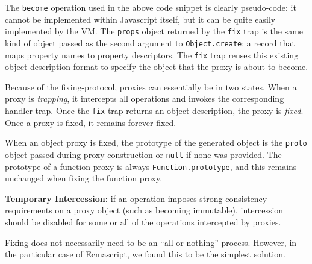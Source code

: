 \documentclass{acm_proc_article-sp}
\begin{document}
The \texttt{become} operation used in the above code snippet is clearly pseudo-code: it cannot be implemented within Javascript itself, but it can be quite easily implemented by the VM. The \texttt{props} object returned by the \texttt{fix} trap is the same kind of object passed as the second argument to \texttt{Object.create}: a record that maps property names to property descriptors. The \texttt{fix} trap reuses this existing object-description format to specify the object that the proxy is about to become.

Because of the fixing-protocol, proxies can essentially be in two states. When a proxy is \emph{trapping}, it intercepts all operations and invokes the corresponding handler trap. Once the \texttt{fix} trap returns an object description, the proxy is \emph{fixed}. Once a proxy is fixed, it remains forever fixed.

When an object proxy is fixed, the prototype of the generated object is the \texttt{proto} object passed during proxy construction or \texttt{null} if none was provided. The prototype of a function proxy is always \texttt{Function.prototype}, and this remains unchanged when fixing the function proxy.

\textbf{Temporary Intercession:} if an operation imposes strong consistency requirements on a proxy object (such as becoming immutable), intercession should be disabled for some or all of the operations intercepted by proxies.

Fixing does not necessarily need to be an ``all or nothing'' process. However, in the particular case of Ecmascript, we found this to be the simplest solution.


%
%
%
\end{document}
